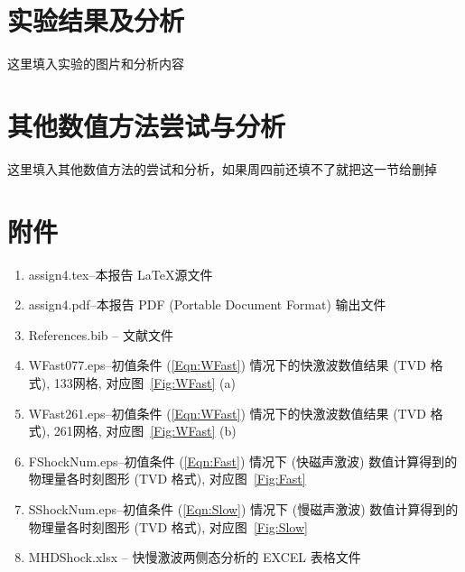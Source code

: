\documentclass[10.5pt
]{article}
\begin{document}
\section{实验结果及分析}
这里填入实验的图片和分析内容

\section{其他数值方法尝试与分析}
这里填入其他数值方法的尝试和分析，如果周四前还填不了就把这一节给删掉

\section{附件}
\begin{enumerate}
\item
assign4.tex--本报告 \LaTeX 源文件
\item
assign4.pdf--本报告 PDF (Portable Document Format) 输出文件
\item
References.bib -- 文献文件
\item
WFast077.eps--初值条件 (\ref{Eqn:WFast}) 情况下的快激波数值结果 (TVD 格式), 133网格, 对应图~\ref{Fig:WFast} (a)
\item
WFast261.eps--初值条件 (\ref{Eqn:WFast}) 情况下的快激波数值结果 (TVD 格式), 261网格, 对应图~\ref{Fig:WFast} (b)
\item
FShockNum.eps--初值条件 (\ref{Eqn:Fast}) 情况下 (快磁声激波) 数值计算得到的物理量各时刻图形 (TVD 格式), 对应图~\ref{Fig:Fast}
\item
SShockNum.eps--初值条件 (\ref{Eqn:Slow}) 情况下 (慢磁声激波) 数值计算得到的物理量各时刻图形 (TVD 格式), 对应图~\ref{Fig:Slow}
\item
MHDShock.xlsx -- 快慢激波两侧态分析的 EXCEL 表格文件
\end{enumerate}


% 
%


\end{document}
